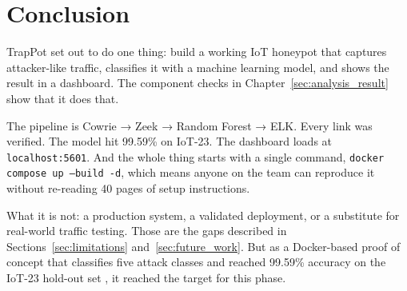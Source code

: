 \section{Conclusion}
\label{sec:conclusion}

TrapPot set out to do one thing: build a working IoT honeypot that captures attacker-like traffic, classifies it with a machine learning model, and shows the result in a dashboard. The component checks in Chapter~\ref{sec:analysis_result} show that it does that.

The pipeline is Cowrie → Zeek → Random Forest → ELK. Every link was verified. The model hit 99.59\% on IoT-23. The dashboard loads at \texttt{localhost:5601}. And the whole thing starts with a single command, \texttt{docker compose up --build -d}, which means anyone on the team can reproduce it without re-reading 40 pages of setup instructions.

What it is not: a production system, a validated deployment, or a substitute for real-world traffic testing. Those are the gaps described in Sections~\ref{sec:limitations} and~\ref{sec:future_work}. But as a Docker-based proof of concept that classifies five attack classes and reached 99.59\% accuracy on the IoT-23 hold-out set \cite{iot23dataset}, it reached the target for this phase.
